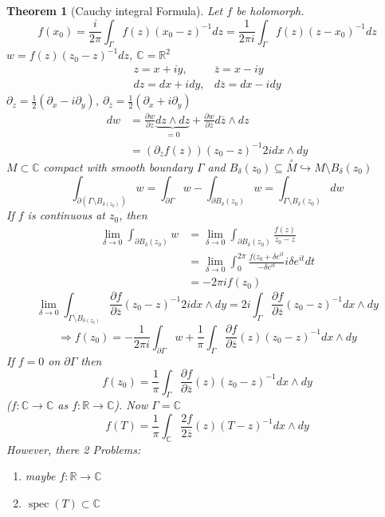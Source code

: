\documentclass[12pt]{extreport} %
\newcommand{\C}{\mathbb{C}}
\newcommand{\R}{\mathbb{R}}
\theoremstyle{named}
\theoremstyle{nnamed}
\newtheorem*{unnamedtheorem*}{Theorem}
\theoremstyle{itshape}
\theoremstyle{normal}
\begin{document}
\begin{unnamedtheorem*}[Cauchy integral Formula]
	Let $f$ be holomorph.
	$$ f(x_0) = \frac{i}{2 \pi} \int_\Gamma f(z) \left( x_0 - z \right)^{-1} dz = \frac{1}{2 \pi i} \int_{\Gamma} f(z) \left(z - x_0 \right)^{-1} dz $$
	$w = f(z) \left( z_0 - z \right)^{-1} dz$, $\C = \R^2$
	\begin{align*}
		z = x + i y, & \overline{z} = x - iy \\
		dz = dx + i dy, & d\overline{z} = dx - i dy
	\end{align*}
	$\partial_z = \frac{1}{2} \left( \partial_x - i \partial_y \right)$, $\partial_{\overline{z}} = \frac{1}{2} \left( \partial_x + i \partial_y \right)$
	\begin{align*}
		dw & = \frac{\partial w}{\partial z} \underbrace{dz \wedge dz}_{=0} + \frac{\partial w}{\partial \overline{z}} d\overline{z} \wedge dz \\
			& = \left( \partial_{\overline{z}} f(z) \right) \left(z_0 - z \right)^{-1} 2i dx \wedge dy
	\end{align*}
	$M \subset \C$ compact with smooth boundary $\Gamma$ and $B_\delta(z_0) \subseteq \overset{\circ}{M} \hookrightarrow M \setminus B_{\delta}(z_0)$
	$$ \int_{\partial \left( \Gamma \setminus B_{\delta(z_0)} \right)} w = \int_{\partial \Gamma} w - \int_{\partial B_{\delta}(z_0)} w = \int_{\Gamma \setminus B_{\delta}(z_0)} dw $$
	If $f$ is continuous at $z_0$, then
	\begin{align*}
		\lim_{\delta \rightarrow 0} \int_{\partial B_{\delta}(z_0)} w & = \lim_{\delta \rightarrow 0} \int_{\partial B_\delta(z_0)} \frac{f(z)}{z_0 - z} \\
			& = \lim_{\delta \rightarrow 0} \int_0^{2 \pi} \frac{f(z_0 + \delta e^{it}}{-\delta e^{it}} i \delta e^{it} dt \\
			& = - 2 \pi i f(z_0)
		\end{align*}
	$$ \lim_{\delta \rightarrow 0} \int_{\Gamma \setminus B_{\delta(z_0)}} \frac{\partial f}{\partial \overline{z}} \left( z_0 - z \right)^{-1} 2 i dx \wedge dy = 2i \int_{\Gamma} \frac{\partial f}{\partial \overline{z}} \left( z_0 - z \right)^{-1} dx \wedge dy $$
		$$ \Rightarrow f(z_0) = - \frac{1}{2 \pi i} \int_{\partial \Gamma} w + \frac{1}{\pi} \int_{\Gamma} \frac{\partial f}{\partial \overline{z}}(z) \left( z_0 - z \right)^{-1} dx \wedge dy $$
	If $f = 0$ on $\partial \Gamma$ then
		$$ f(z_0) = \frac{1}{\pi} \int_{\Gamma} \frac{\partial f}{\partial \overline{z}}(z) \left( z_0 - z \right)^{-1} dx \wedge dy $$
	($f \colon \C \rightarrow \C$  as $f \colon \R \rightarrow \C$). Now $\Gamma = \C$ %
	$$ f(T) = \frac{1}{\pi} \int_{\C} \frac{2f}{2 \overline{z}}(z) \left( T - z \right)^{-1} dx \wedge dy $$
	However, there 2 Problems:
	\begin{enumerate}[label=\arabic*\upshape)]
		\item maybe $f \colon \R \rightarrow \C$
		\item $\operatorname{spec}(T) \subset \C$
	\end{enumerate}
\end{unnamedtheorem*}
\end{document}

